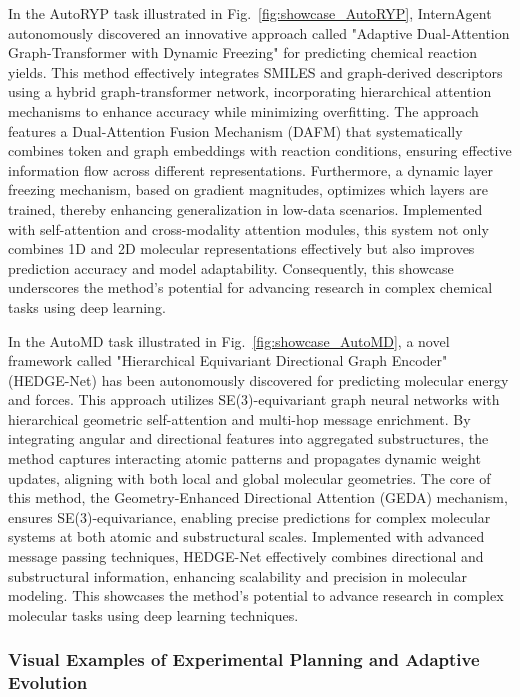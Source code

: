 In the AutoRYP task illustrated in Fig.~\ref{fig:showcase_AutoRYP}, InternAgent autonomously discovered an innovative approach called "Adaptive Dual-Attention Graph-Transformer with Dynamic Freezing" for predicting chemical reaction yields. This method effectively integrates SMILES and graph-derived descriptors using a hybrid graph-transformer network, incorporating hierarchical attention mechanisms to enhance accuracy while minimizing overfitting. The approach features a Dual-Attention Fusion Mechanism (DAFM) that systematically combines token and graph embeddings with reaction conditions, ensuring effective information flow across different representations. Furthermore, a dynamic layer freezing mechanism, based on gradient magnitudes, optimizes which layers are trained, thereby enhancing generalization in low-data scenarios. Implemented with self-attention and cross-modality attention modules, this system not only combines 1D and 2D molecular representations effectively but also improves prediction accuracy and model adaptability. Consequently, this showcase underscores the method's potential for advancing research in complex chemical tasks using deep learning.

In the AutoMD task illustrated in Fig.~\ref{fig:showcase_AutoMD}, a novel framework called "Hierarchical Equivariant Directional Graph Encoder" (HEDGE-Net) has been autonomously discovered for predicting molecular energy and forces. This approach utilizes SE(3)-equivariant graph neural networks with hierarchical geometric self-attention and multi-hop message enrichment. By integrating angular and directional features into aggregated substructures, the method captures interacting atomic patterns and propagates dynamic weight updates, aligning with both local and global molecular geometries. The core of this method, the Geometry-Enhanced Directional Attention (GEDA) mechanism, ensures SE(3)-equivariance, enabling precise predictions for complex molecular systems at both atomic and substructural scales. Implemented with advanced message passing techniques, HEDGE-Net effectively combines directional and substructural information, enhancing scalability and precision in molecular modeling. This showcases the method's potential to advance research in complex molecular tasks using deep learning techniques.


\subsubsection{Visual Examples of Experimental Planning and Adaptive  Evolution}
\label{sec:case_exp_evo}

